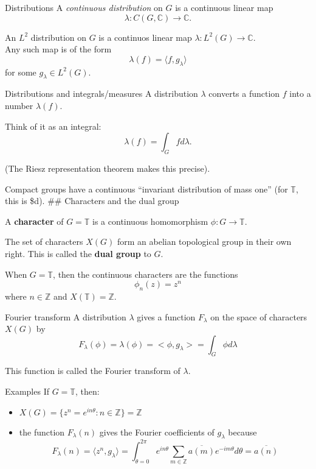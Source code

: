 \documentclass[
  ignorenonframetext,
]{beamer}
\providecommand{\tightlist}{%
  \setlength{\itemsep}{0pt}\setlength{\parskip}{0pt}}
\begin{document}
\begin{frame}{Distributions}
\protect\hypertarget{distributions}{}
A \emph{continuous distribution} on \(G\) is a continuous linear map \[
\lambda: C(G,\mathbb{C})\to \mathbb{C}.
\]

An \(L^{2}\) distribution on \(G\) is a continuos linear map
\(\lambda:L^{2}(G)\to\mathbb{C}\).\\
Any such map is of the form \[
\lambda(f)=\langle f,g_{\lambda}\rangle
\] for some \(g_{\lambda}\in L^{2}(G)\).
\end{frame}

\begin{frame}{Distributions and integrals/measures}
\protect\hypertarget{distributions-and-integralsmeasures}{}
A distribution \(\lambda\) converts a function \(f\) into a number
\(\lambda(f)\).

Think of it as an integral: \[
\lambda(f)=\int_{G} f d\lambda.
\]

(The Riesz representation theorem makes this precise).

Compact groups have a continuous ``invariant distribution of mass one''
(for \(\mathbb{T}\), this is \$d\theta). \#\# Characters
and the dual group

A \textbf{character} of \(G=\mathbb{T}\) is a continuous homomorphism
\(\phi:G\to \mathbb{T}\).

The set of characters \(X(G)\) form an abelian topological group in
their own right. This is called the \textbf{dual group} to \(G\).

When \(G=\mathbb{T}\), then the continuous characters are the functions
\[
\phi_{n}(z)=z^{n}
\] where \(n\in\mathbb{Z}\) and \(X(\mathbb{T})=\mathbb{Z}\).
\end{frame}

\begin{frame}{Fourier transform}
\protect\hypertarget{fourier-transform}{}
A distribution \(\lambda\) gives a function \(F_{\lambda}\) on the space
of characters \(X(G)\) by \[
F_{\lambda}(\phi) = \lambda(\phi)=<\phi,g_{\lambda}> = \int_{G} \phi d\lambda
\]

This function is called the Fourier transform of \(\lambda\).
\end{frame}

\begin{frame}{Examples}
\protect\hypertarget{examples}{}
If \(G=\mathbb{T}\), then:

\begin{itemize}
\tightlist
\item
  \(X(G)=\{z^{n}=e^{in\theta}:n\in\mathbb{Z}\}=\mathbb{Z}\)
\item
  the function \(F_{\lambda}(n)\) gives the Fourier coefficients of
  \(g_{\lambda}\) because
  \[F_{\lambda}(n)=\langle z^{n},g_{\lambda}\rangle = \int_{\theta=0}^{2\pi} e^{in\theta}\sum_{m\in\mathbb{Z}} \overline{a(m)}e^{-im\theta}d\theta = \overline{a(n)}\]
\end{itemize}
\end{frame}
\end{document}
